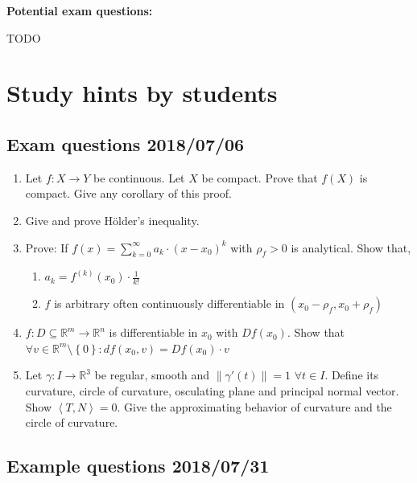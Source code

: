 \documentclass{article}
\newcommand{\set}[1]{\left\{#1\right\}}
\newcommand{\angel}[1]{\left\langle#1\right\rangle}
\newcommand{\norm}[1]{\left\|#1\right\|}
\begin{document}
\textbf{Potential exam questions:}

TODO

\section{Study hints by students}

\subsection{Exam questions 2018/07/06}

\begin{enumerate}
  \item Let $f: X \to Y$ be continuous. Let $X$ be compact. Prove that $f(X)$ is compact. Give any corollary of this proof.
  \item Give and prove H\"older's inequality.
  \item Prove: If $f(x) = \sum_{k=0}^\infty a_k \cdot (x - x_0)^k$ with $\rho_f > 0$ is analytical.
    Show that,
    \begin{enumerate}
      \item $a_k = f^{(k)}(x_0) \cdot \frac{1}{k!}$
      \item $f$ is arbitrary often continuously differentiable in $(x_0 - \rho_f, x_0 + \rho_f)$
    \end{enumerate}
  \item $f: D \subseteq \mathbb R^m \to \mathbb R^n$ is differentiable in $x_0$ with $Df(x_0)$. Show that $\forall v \in \mathbb R^m \setminus \set{0}: df(x_0, v) = Df(x_0) \cdot v$
  \item Let $\gamma: I \to \mathbb R^3$ be regular, smooth and $\norm{\gamma'(t)} = 1$ $\forall t \in I$. Define its curvature, circle of curvature, osculating plane and principal normal vector. Show $\angel{T, N} = 0$. Give the approximating behavior of curvature and the circle of curvature.
\end{enumerate}

\subsection{Example questions 2018/07/31}
\end{document}
